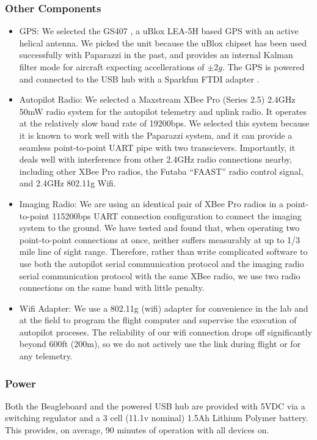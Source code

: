 \documentclass[pdftex,10pt,letter]{article}
\begin{document}
\subsubsection{Other Components}
\begin{itemize}
	\setlength{\itemsep}{0cm}
	\setlength{\parskip}{0cm}
	\item GPS: We selected the GS407 \cite{gs407gps}, a uBlox LEA-5H \cite{ublox_lea5h} based GPS with an active helical antenna. We picked the unit because the uBlox chipset has been used successfully with Paparazzi in the past, and provides an internal Kalman filter mode for aircraft expecting accellerations of $\pm2g$. The GPS is powered and connected to the USB hub with a Sparkfun FTDI adapter \cite{sparkfun_ftdi}. 
	\item Autopilot Radio: We selected a Maxstream XBee Pro (Series 2.5) 2.4GHz 50mW \cite{xbeepro24} radio system for the autopilot telemetry and uplink radio. It operates at the relatively slow baud rate of 19200bps. We selected this system because it is known to work well with the Paparazzi system, and it can provide a seamless point-to-point UART pipe with two transcievers. Importantly, it deals well with interference from other 2.4GHz radio connections nearby, including other XBee Pro radios, the Futaba ``FAAST'' radio control signal, and 2.4GHz 802.11g Wifi.
	\item Imaging Radio: We are using an identical pair of XBee Pro radios in a point-to-point 115200bps UART connection configuration to connect the imaging system to the ground. We have tested and found that, when operating two point-to-point connections at once, neither suffers measurably at up to 1/3 mile line of sight range. Therefore, rather than write complicated software to use both the autopilot serial communication protocol and the imaging radio serial communication protocol with the same XBee radio, we use two radio connections on the same band with little penalty. 
	\item Wifi Adapter: We use a 802.11g (wifi) adapter for convenience in the lab and at the field to program the flight computer and supervise the execution of autopilot proceses. The reliability of our wifi connection drops off significantly beyond 600ft (200m), so we do not actively use the link during flight or for any telemetry.
\end{itemize}
\subsubsection{Power}
Both the Beagleboard and the powered USB hub are provided with 5VDC via a switching regulator and a 3 cell (11.1v nominal) 1.5Ah Lithium Polymer battery. This provides, on average, 90 minutes of operation with all devices on.
\end{document}

